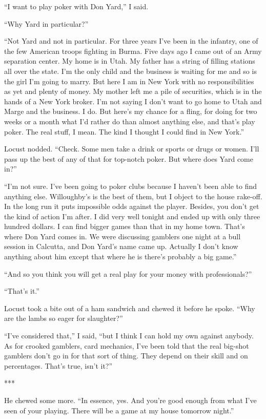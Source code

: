 {“I want to play poker with Don Yard,” I said.

“Why Yard in particular?”

“Not Yard and not in particular. For three years I’ve been in the infantry, one of the few American troops fighting in Burma. Five days ago I came out of an Army separation center. My home is in Utah. My father has a string of filling stations all over the state. I’m the only child and the business is waiting for me and so is the girl I’m going to marry. But here I am in New York with no responsibilities as yet and plenty of money. My mother left me a pile of securities, which is in the hands of a New York broker. I’m not saying I don’t want to go home to Utah and Marge and the business. I do. But here’s my chance for a fling, for doing for two weeks or a month what I’d rather do than almost anything else, and that’s play poker. The real stuff, I mean. The kind I thought I could find in New York.”

Locust nodded. “Check. Some men take a drink or sports or drugs or women. I’ll pass up the best of any of that for top-notch poker. But where does Yard come in?”

“I’m not sure. I’ve been going to poker clubs because I haven’t been able to find anything else. Willoughby’s is the best of them, but I object to the house rake-off. In the long run it puts impossible odds against the player. Besides, you don’t get the kind of action I’m after. I did very well tonight and ended up with only three hundred dollars. I can find bigger games than that in my home town. That’s where Don Yard comes in. We were discussing gamblers one night at a bull session in Calcutta, and Don Yard’s name came up. Actually I don’t know anything about him except that where he is there’s probably a big game.”

“And so you think you will get a real play for your money with professionals?”

“That’s it.”

Locust took a bite out of a ham sandwich and chewed it before he spoke. “Why are the lambs so eager for slaughter?”

“I’ve considered that,” I said, “but I think I can hold my own against anybody. As for crooked gamblers, card mechanics, I’ve been told that the real big-shot gamblers don’t go in for that sort of thing. They depend on their skill and on percentages. That’s true, isn’t it?”

***

He chewed some more. “In essence, yes. And you’re good enough from what I’ve seen of your playing. There will be a game at my house tomorrow night.”

}

